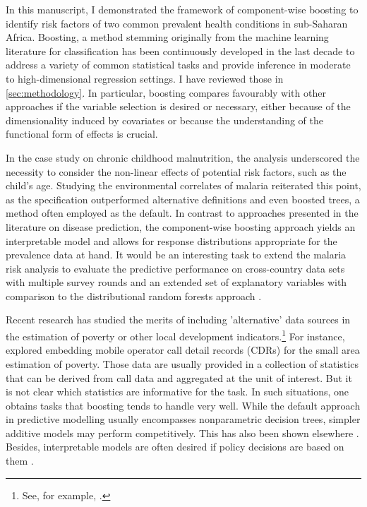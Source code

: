 In this manuscript, I demonstrated the framework of component-wise boosting to identify risk factors of two common prevalent health conditions in sub-Saharan Africa. Boosting, a method stemming originally from the machine learning literature for classification has been continuously developed in the last decade to address a variety of common statistical tasks and provide inference in moderate to high-dimensional regression settings. I have reviewed those in \autoref{sec:methodology}. In particular, boosting compares favourably with other approaches if the variable selection is desired or necessary, either because of the dimensionality induced by covariates or because the understanding of the functional form of effects is crucial.  

In the case study on chronic childhood malnutrition, the analysis underscored the necessity to consider the non-linear effects of potential risk factors, such as the child's age. Studying the environmental correlates of malaria reiterated this point, as the specification outperformed alternative definitions and even boosted trees, a method often employed as the default. In contrast to approaches presented in the literature on disease prediction, the component-wise boosting approach yields an interpretable model and allows for response distributions appropriate for the prevalence data at hand. It would be an interesting task to extend the malaria risk analysis to evaluate the predictive performance on cross-country data sets with multiple survey rounds and an extended set of explanatory variables with comparison to the distributional random forests approach \autocite{schlosserDistributionalRegressionForests2019}. 

Recent research has studied the merits of including 'alternative' data sources in the estimation of poverty or other local development indicators.\footnote{See, for example, \textcite{jeanCombiningSatelliteImagery2016, papeEstimationPovertySomalia2019, aikenMachineLearningPhone2022, ziuluPovertyMappingInnovative2022, aikenProgramTargetingMachine2023}.} For instance, \textcite{steeleMappingPovertyUsing2017} explored embedding mobile operator call detail records (CDRs) for the small area estimation of poverty. Those data are usually provided in a collection of statistics that can be derived from call data and aggregated at the unit of interest. But it is not clear which statistics are informative for the task. In such situations, one obtains tasks that boosting tends to handle very well. While the default approach in predictive modelling usually encompasses nonparametric decision trees, simpler additive models may perform competitively. This has also been shown elsewhere \autocite{kapoorLeakageReproducibilityCrisis2022}. Besides, interpretable models are often desired if policy decisions are based on them \autocite{rahmanPredictiveAnalyticsChildren2021}.

